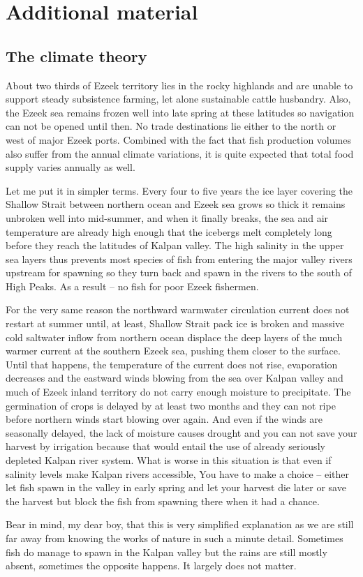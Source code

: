 \chapter{Additional material}

\section{The climate theory}

About two thirds of Ezeek territory lies in the rocky highlands and are unable to support steady subsistence farming, let alone sustainable cattle husbandry. Also, the Ezeek sea remains frozen well into late spring at these latitudes so navigation can not be opened until then. No trade destinations lie either to the north or west of major Ezeek ports. Combined with the fact that fish production volumes also suffer from the annual climate variations, it is quite expected that total food supply varies annually as well.

Let me put it in simpler terms. Every four to five years the ice layer covering the Shallow Strait between northern ocean and Ezeek sea grows so thick it remains unbroken well into mid-summer, and when it finally breaks, the sea and air temperature are already high enough that the icebergs melt completely long before they reach the latitudes of Kalpan valley. The high salinity in the upper sea layers thus prevents most species of fish from entering the major valley rivers upstream for spawning so they turn back and spawn in the rivers to the south of High Peaks. As a result -- no fish for poor Ezeek fishermen.

For the very same reason the northward warmwater circulation current does not restart at summer until, at least, Shallow Strait pack ice is broken and massive cold saltwater inflow from northern ocean displace the deep layers of the much warmer current at the southern Ezeek sea, pushing them closer to the surface. Until that happens, the temperature of the current does not rise, evaporation decreases and the eastward winds blowing from the sea over Kalpan valley and much of Ezeek inland territory do not carry enough moisture to precipitate. The germination of crops is delayed by at least two months and they can not ripe before northern winds start blowing over again. And even if the winds are seasonally delayed, the lack of moisture causes drought and you can not save your harvest by irrigation because that would entail the use of already seriously depleted Kalpan river system. What is worse in this situation is that even if salinity levels make Kalpan rivers accessible, You have to make a choice -- either let fish spawn in the valley in early spring and let your harvest die later or save the harvest but block the fish from spawning there when it had a chance.

Bear in mind, my dear boy, that this is very simplified explanation as we are still far away from knowing the works of nature in such a minute detail. Sometimes fish do manage to spawn in the Kalpan valley but the rains are still mostly absent, sometimes the opposite happens. It largely does not matter.

